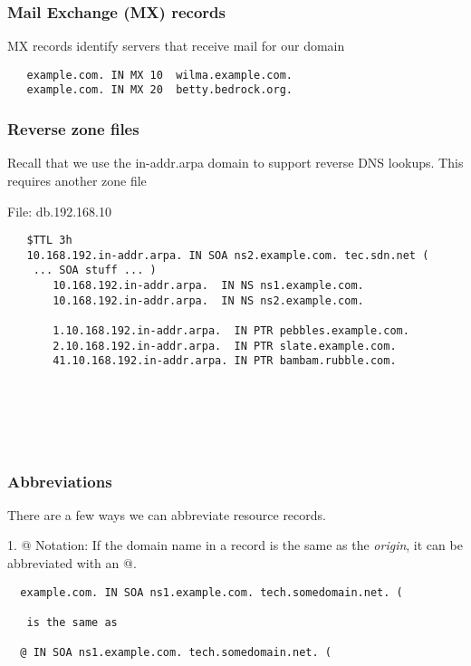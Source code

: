 \documentclass[10pt]{beamer}
\begin{document}
\begin{frame}[fragile]
  \frametitle{Mail Exchange (MX) records}
 MX records identify servers that receive mail for our domain
 \begin{verbatim}
   example.com. IN MX 10  wilma.example.com.  
   example.com. IN MX 20  betty.bedrock.org.
 \end{verbatim}

\end{frame}


\begin{frame}[fragile]
  \frametitle{Reverse zone files}

 Recall that we use the in-addr.arpa domain to support reverse DNS 
 lookups.  This requires another zone file
 
 File: db.192.168.10
 \begin{verbatim}
   $TTL 3h
   10.168.192.in-addr.arpa. IN SOA ns2.example.com. tec.sdn.net (
    ... SOA stuff ... )
       10.168.192.in-addr.arpa.  IN NS ns1.example.com.
       10.168.192.in-addr.arpa.  IN NS ns2.example.com.

       1.10.168.192.in-addr.arpa.  IN PTR pebbles.example.com.
       2.10.168.192.in-addr.arpa.  IN PTR slate.example.com.
       41.10.168.192.in-addr.arpa. IN PTR bambam.rubble.com.


   
 \end{verbatim}

\end{frame}




\begin{frame}[fragile]
  \frametitle{}

 \begin{verbatim}
   
 \end{verbatim}

\end{frame}

\begin{frame}[fragile]
  \frametitle{Abbreviations}
 There are a few ways we can abbreviate resource records.

 1.  @ Notation: If the domain name in a record is the same as the 
 \emph{origin}, it can be abbreviated with an @.
 \begin{verbatim}
  example.com. IN SOA ns1.example.com. tech.somedomain.net. (
 
   is the same as 
 
  @ IN SOA ns1.example.com. tech.somedomain.net. (


   
 \end{verbatim}

\end{frame}
\end{document}
